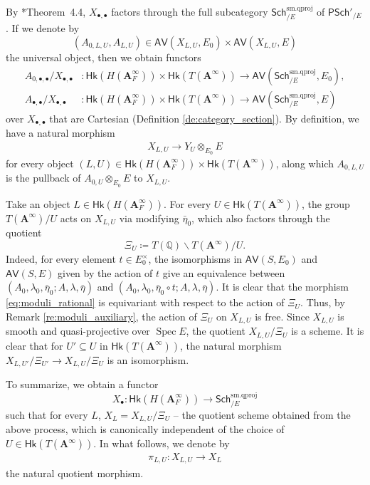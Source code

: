 \documentclass[12pt]{amsart}
\numberwithin{equation}{section}
\theoremstyle{plain}
\theoremstyle{definition}
\theoremstyle{remark}
\renewcommand{\b}[1]{\mathbf{#1}}
\renewcommand{\d}[1]{\mathbb{#1}}
\renewcommand{\r}[1]{\mathrm{#1}}
\renewcommand{\sf}[1]{\mathsf{#1}}
\renewcommand{\(}{\left(}
\renewcommand{\)}{\right)}
\newcommand{\bA}{\b A}
\newcommand{\dQ}{\d Q}
\newcommand{\sfP}{\sf P}
\newcommand{\smq}{\r{sm.qproj}}
\newcommand{\Sch}{\sf{Sch}}
\newcommand{\AV}{\sf{AV}}
\newcommand{\Hk}{\sf{Hk}}
\DeclareMathOperator{\Spec}{Spec}
\begin{document}
By \cite{RSZ}*{Theorem~4.4}, $X_{\bullet,\bullet}$ factors through the full subcategory $\Sch^\smq_{/E}$ of $\sfP\Sch'_{/E}$. If we denote by
\[
(A_{0,L,U},A_{L,U})\in\AV(X_{L,U},E_0)\times\AV(X_{L,U},E)
\]
the universal object, then we obtain functors
\begin{align*}
A_{0,\bullet,\bullet}/X_{\bullet,\bullet}&\colon\Hk(H(\bA_F^\infty))\times\Hk(T(\bA^\infty))\to\AV(\Sch^\smq_{/E},E_0),\\
A_{\bullet,\bullet}/X_{\bullet,\bullet}&\colon\Hk(H(\bA_F^\infty))\times\Hk(T(\bA^\infty))\to\AV(\Sch^\smq_{/E},E)
\end{align*}
over $X_{\bullet,\bullet}$ that are Cartesian (Definition \ref{de:category_section}). By definition, we have a natural morphism
\begin{align}\label{eq:moduli_rational}
X_{L,U}\to Y_U\otimes_{E_0}E
\end{align}
for every object $(L,U)\in\Hk(H(\bA_F^\infty))\times\Hk(T(\bA^\infty))$, along which $A_{0,L,U}$ is the pullback of $A_{0,U}\otimes_{E_0}E$ to $X_{L,U}$.





Take an object $L\in\Hk(H(\bA_F^\infty))$. For every $U\in\Hk(T(\bA^\infty))$, the group $T(\bA^\infty)/U$ acts on $X_{L,U}$ via modifying $\bar\eta_0$, which also factors through the quotient
\[
\Xi_U\coloneqq T(\dQ)\backslash T(\bA^\infty)/U.
\]
Indeed, for every element $t\in E_0^\times$, the isomorphisms in $\AV(S,E_0)$ and $\AV(S,E)$ given by the action of $t$ give an equivalence between $(A_0,\lambda_0,\bar\eta_0;A,\lambda,\bar\eta)$ and $(A_0,\lambda_0,\bar\eta_0\circ t;A,\lambda,\bar\eta)$. It is clear that the morphism \eqref{eq:moduli_rational} is equivariant with respect to the action of $\Xi_U$. Thus, by Remark \ref{re:moduli_auxiliary}, the action of $\Xi_U$ on $X_{L,U}$ is free. Since $X_{L,U}$ is smooth and quasi-projective over $\Spec E$, the quotient $X_{L,U}/\Xi_U$ is a scheme. It is clear that for $U'\subseteq U$ in $\Hk(T(\bA^\infty))$, the natural morphism $X_{L,U'}/\Xi_{U'}\to X_{L,U}/\Xi_U$ is an isomorphism.

To summarize, we obtain a functor
\[
X_\bullet\colon\Hk(H(\bA_F^\infty))\to\Sch^\smq_{/E}
\]
such that for every $L$, $X_L=X_{L,U}/\Xi_U$ -- the quotient scheme obtained from the above process, which is canonically independent of the choice of $U\in\Hk(T(\bA^\infty))$. In what follows, we denote by
\begin{align}\label{eq:quotient_morphism}
\pi_{L,U}\colon X_{L,U}\to X_L
\end{align}
the natural quotient morphism.
\end{document}
